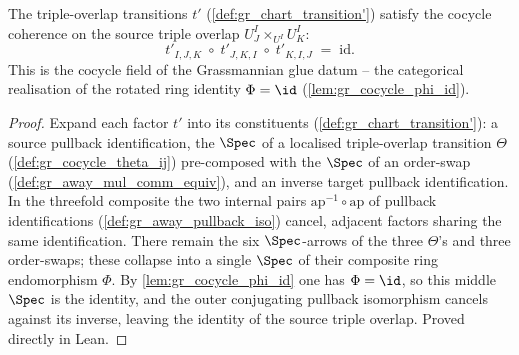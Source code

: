 \begin{lemma}

  \label{lem:gr_chartTransition'_cocycle}
  The triple-overlap transitions \(t'\) (\cref{def:gr_chart_transition'}) satisfy
  the cocycle coherence on the source triple overlap \(U^I_J \times_{U^I} U^I_K\):
  \[
    t'_{I,J,K} \;\circ\; t'_{J,K,I} \;\circ\; t'_{K,I,J} \;=\; \mathrm{id}.
  \]
  This is the \(\mathrm{cocycle}\) field of the Grassmannian glue datum -- the
  categorical realisation of the rotated ring identity \(\Phi = \id\)
  (\cref{lem:gr_cocycle_phi_id}).
\end{lemma}
\begin{proof}
  \leanok
  Expand each factor \(t'\) into its constituents
  (\cref{def:gr_chart_transition'}): a source pullback identification, the
  \(\Spec\) of a localised triple-overlap transition \(\Theta\)
  (\cref{def:gr_cocycle_theta_ij}) pre-composed with the \(\Spec\) of an
  order-swap (\cref{def:gr_away_mul_comm_equiv}), and an inverse target pullback
  identification. In the threefold composite the two internal pairs
  \(\mathrm{ap}^{-1} \circ \mathrm{ap}\) of pullback identifications
  (\cref{def:gr_away_pullback_iso}) cancel, adjacent factors sharing the same
  identification. There remain the six \(\Spec\)-arrows of the three \(\Theta\)'s
  and three order-swaps; these collapse into a single \(\Spec\) of their composite
  ring endomorphism \(\Phi\). By \cref{lem:gr_cocycle_phi_id} one has
  \(\Phi = \id\), so this middle \(\Spec\) is the identity, and the outer
  conjugating pullback isomorphism cancels against its inverse, leaving the
  identity of the source triple overlap. Proved directly in Lean.
\end{proof}


